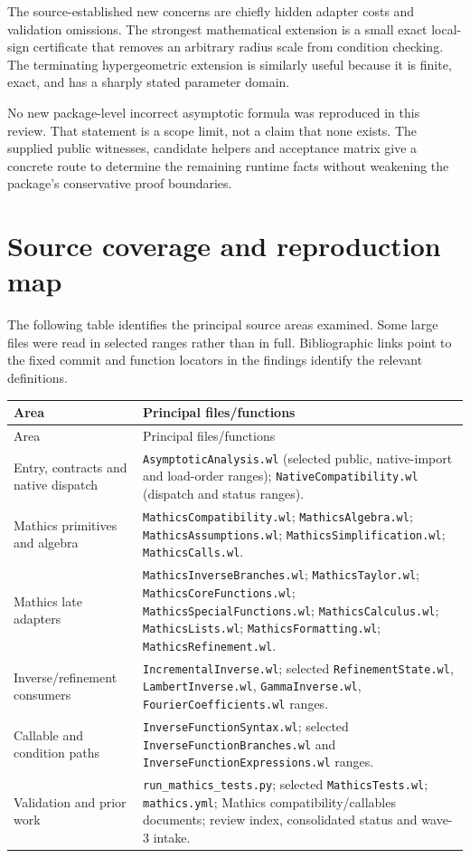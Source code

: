 \documentclass[11pt,letterpaper]{article}
\newcommand{\code}[1]{\nolinkurl{#1}}
\begin{document}
The source-established new concerns are chiefly hidden adapter costs and
validation omissions. The strongest mathematical extension is a small exact
local-sign certificate that removes an arbitrary radius scale from condition
checking. The terminating hypergeometric extension is similarly useful
because it is finite, exact, and has a sharply stated parameter domain.

No new package-level incorrect asymptotic formula was reproduced in this
review. That statement is a scope limit, not a claim that none exists.
The supplied public witnesses, candidate helpers and acceptance matrix give
a concrete route to determine the remaining runtime facts without weakening
the package's conservative proof boundaries.

\appendix
\section{Source coverage and reproduction map}
\label{app:sources}

The following table identifies the principal source areas examined. Some
large files were read in selected ranges rather than in full. Bibliographic
links point to the fixed commit and function locators in the findings identify
the relevant definitions.

\small
\begin{longtable}{P{0.26\textwidth}P{0.66\textwidth}}
\toprule
Area & Principal files/functions\\\midrule
\endfirsthead
\toprule Area & Principal files/functions\\\midrule
\endhead
Entry, contracts and native dispatch & \code{AsymptoticAnalysis.wl} (selected public, native-import and load-order ranges); \code{NativeCompatibility.wl} (dispatch and status ranges).\\
Mathics primitives and algebra & \code{MathicsCompatibility.wl}; \code{MathicsAlgebra.wl}; \code{MathicsAssumptions.wl}; \code{MathicsSimplification.wl}; \code{MathicsCalls.wl}.\\
Mathics late adapters & \code{MathicsInverseBranches.wl}; \code{MathicsTaylor.wl}; \code{MathicsCoreFunctions.wl}; \code{MathicsSpecialFunctions.wl}; \code{MathicsCalculus.wl}; \code{MathicsLists.wl}; \code{MathicsFormatting.wl}; \code{MathicsRefinement.wl}.\\
Inverse/refinement consumers & \code{IncrementalInverse.wl}; selected \code{RefinementState.wl}, \code{LambertInverse.wl}, \code{GammaInverse.wl}, \code{FourierCoefficients.wl} ranges.\\
Callable and condition paths & \code{InverseFunctionSyntax.wl}; selected \code{InverseFunctionBranches.wl} and \code{InverseFunctionExpressions.wl} ranges.\\
Validation and prior work & \code{run_mathics_tests.py}; selected \code{MathicsTests.wl}; \code{mathics.yml}; Mathics compatibility/callables documents; review index, consolidated status and wave-3 intake.\\
\bottomrule
\end{longtable}
\normalsize
\end{document}

